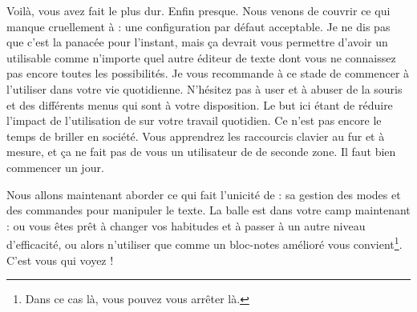 Voilà, vous avez fait le plus dur. Enfin presque. Nous venons de couvrir ce qui manque cruellement à \vim : une configuration par défaut acceptable. Je ne dis pas que c'est la panacée pour l'instant, mais ça devrait vous permettre d'avoir un \vim utilisable comme n'importe quel autre éditeur de texte dont vous ne connaissez pas encore toutes les possibilités. Je vous recommande à ce stade de commencer à l'utiliser dans votre vie quotidienne. N'hésitez pas à user et à abuser de la souris et des différents menus qui sont à votre disposition. Le but ici étant de réduire l'impact de l'utilisation de \vim sur votre travail quotidien. Ce n'est pas encore le temps de briller en société. Vous apprendrez les raccourcis clavier au fur et à mesure, et ça ne fait pas de vous un utilisateur de \vim de seconde zone. Il faut bien commencer un jour.

Nous allons maintenant aborder ce qui fait l'unicité de \vim : sa gestion des modes et des commandes pour manipuler le texte. La balle est dans votre camp maintenant : ou vous êtes prêt à changer vos habitudes et à passer à un autre niveau d'efficacité, ou alors n'utiliser \vim que comme un bloc-notes amélioré vous convient\footnote{Dans ce cas là, vous pouvez vous arrêter là.}. C'est vous qui voyez !
